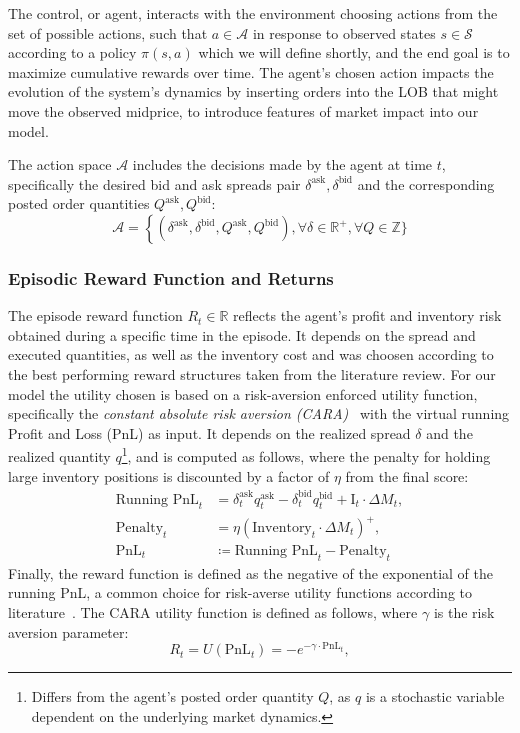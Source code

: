 The control, or agent, interacts with the environment choosing actions from the set of possible actions,
such that $a \in \mathcal{A}$ in response to observed states $s \in \mathcal{S}$ according to a policy $\pi (s, a)$ which we will define shortly,
and the end goal is to maximize cumulative rewards over time.
The agent's chosen action impacts the evolution of the system's dynamics by inserting orders into the LOB that might move the observed midprice,
to introduce features of market impact into our model.

The action space $\mathcal{A}$ includes the decisions made by the agent at time $t$, specifically the desired bid and ask spreads pair
$\delta^{\text{ask}}, \delta^{\text{bid}}$ and the corresponding posted order quantities $Q^{\text{ask}}, Q^{\text{bid}}$:
$$
\mathcal{A} = \left\{ (\delta^{\text{ask}}, \delta^{\text{bid}}, Q^{\text{ask}}, Q^{\text{bid}}), \forall \delta \in \mathbb{R}^+, \forall Q \in \mathbb{Z}\} \right.
$$

\subsubsection{Episodic Reward Function and Returns}

The episode reward function $R_t \in \mathbb{R}$ reflects the agent's profit and inventory risk obtained during a specific time in the episode.
It depends on the spread and executed quantities, as well as the inventory cost and was choosen according to the best performing reward structures taken from the literature review.
For our model the utility chosen is based on a risk-aversion enforced utility function, specifically the \textit{constant absolute risk aversion (CARA)}~\cite{Arrow1965, Pratt1964}
with the virtual running Profit and Loss (PnL) as input.
It depends on the realized spread $\delta$ and the realized quantity $q$\footnote{Differs from the agent's posted order quantity $Q$, as $q$ is a stochastic variable dependent on the underlying market dynamics.},
and is computed as follows, where the penalty for holding large inventory positions is discounted by a factor of \( \eta \) from the final score:
\[
\begin{aligned}
    \text{Running PnL}_t &= \delta_t^{\text{ask}} q_t^{\text{ask}} - \delta_t^{\text{bid}} q_t^{\text{bid}} + \text{I}_t \cdot \Delta M_t, \\
    \text{Penalty}_t &= \eta \left( \text{Inventory}_t \cdot \Delta M_t \right)^+,\\
    \text{PnL}_t &\coloneqq \text{Running PnL}_t - \text{Penalty}_t
\end{aligned}
\]
Finally, the reward function is defined as the negative of the exponential of the running PnL, a common choice for risk-averse utility functions according to literature~\cite{Gueant2022, Selser2021a, FalcesMarin2022}.
The CARA utility function is defined as follows, where \( \gamma \) is the risk aversion parameter:
\[
    R_t = U(\text{PnL}_t) = -e^{-\gamma \cdot \text{PnL}_t},
\]

